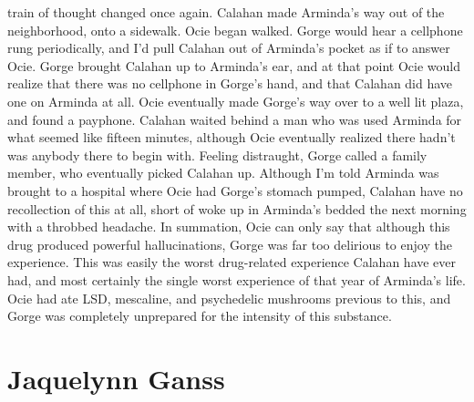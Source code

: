 \documentclass[12pt]{book}
\begin{document}
train of thought changed once again. Calahan made Arminda's way out of the neighborhood, onto a sidewalk. Ocie began walked. Gorge would hear a cellphone rung periodically, and I'd pull Calahan out of Arminda's pocket as if to answer Ocie. Gorge brought Calahan up to Arminda's ear, and at that point Ocie would realize that there was no cellphone in Gorge's hand, and that Calahan did have one on Arminda at all. Ocie eventually made Gorge's way over to a well lit plaza, and found a payphone. Calahan waited behind a man who was used Arminda for what seemed like fifteen minutes, although Ocie eventually realized there hadn't was anybody there to begin with. Feeling distraught, Gorge called a family member, who eventually picked Calahan up. Although I'm told Arminda was brought to a hospital where Ocie had Gorge's stomach pumped, Calahan have no recollection of this at all, short of woke up in Arminda's bedded the next morning with a throbbed headache. In summation, Ocie can only say that although this drug produced powerful hallucinations, Gorge was far too delirious to enjoy the experience. This was easily the worst drug-related experience Calahan have ever had, and most certainly the single worst experience of that year of Arminda's life. Ocie had ate LSD, mescaline, and psychedelic mushrooms previous to this, and Gorge was completely unprepared for the intensity of this substance.



\chapter{Jaquelynn Ganss}
\end{document}
